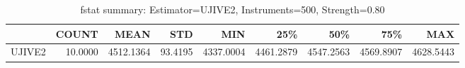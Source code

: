 \begin{table}[ht]
\centering
\caption{fstat summary: Estimator=UJIVE2, Instruments=500, Strength=0.80}
\begin{tabular}{lrrrrrrrr}
\toprule
 & COUNT & MEAN & STD & MIN & 25\% & 50\% & 75\% & MAX \\
\midrule
UJIVE2 & 10.0000 & 4512.1364 & 93.4195 & 4337.0004 & 4461.2879 & 4547.2563 & 4569.8907 & 4628.5443 \\
\bottomrule
\end{tabular}
\end{table}
